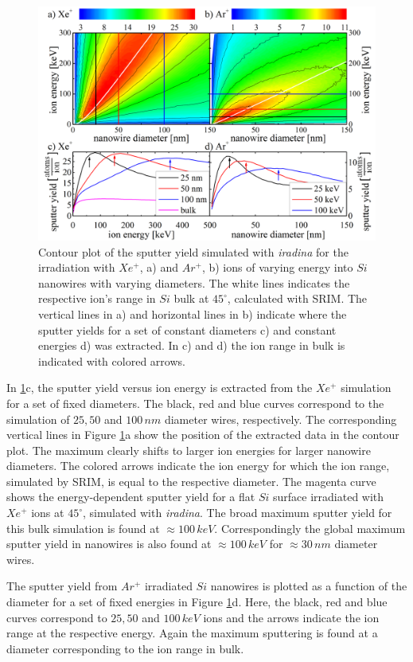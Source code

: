 \begin{figure}[th]
	\centering
		\includegraphics[width=.9\textwidth]{images/sputtering_diameter_energy.png}
	\caption{Contour plot of the sputter yield simulated with \emph{iradina} for the irradiation with $Xe^+$, a) and $Ar^+$, b) ions of varying energy into $Si$ nanowires with varying diameters. The white lines indicates the respective ion's range in $Si$ bulk at $45^\circ$, calculated with SRIM. The vertical lines in a) and horizontal lines in b) indicate where the sputter yields for a set of constant diameters c) and constant energies d) was extracted. In c) and d) the ion range in bulk is indicated with colored arrows.} 
	\label{sputtering_de}
\end{figure} 

In \ref{sputtering_de}c, the sputter yield versus ion energy is extracted from the $Xe^+$ simulation for a set of fixed diameters. The black, red and blue curves correspond to the simulation of $25, 50$ and $100\,nm$ diameter wires, respectively. The corresponding vertical lines in Figure \ref{sputtering_de}a show the position of the extracted data in the contour plot. The maximum clearly shifts to larger ion energies for larger nanowire diameters. The colored arrows indicate the ion energy for which the ion range, simulated by SRIM, is equal to the respective diameter. The magenta curve shows the energy-dependent sputter yield for a flat $Si$ surface irradiated with $Xe^+$ ions at $45^\circ$, simulated with \emph{iradina}. The broad maximum sputter yield for this bulk simulation is found at $\approx 100 \,keV$. Correspondingly the global maximum sputter yield in nanowires is also found at $\approx 100 \,keV$ for $\approx 30\,nm$ diameter wires.

The sputter yield from $Ar^+$ irradiated $Si$ nanowires is plotted as a function of the diameter for a set of fixed energies in Figure \ref{sputtering_de}d. Here, the black, red and blue curves correspond to $25, 50$ and $100\,keV$ ions and the arrows indicate the ion range at the respective energy. Again the maximum sputtering is found at a diameter corresponding to the ion range in bulk.

